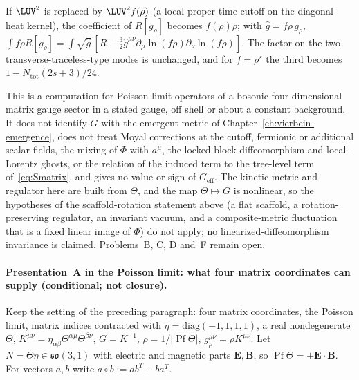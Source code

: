 If \(\LUV^2\) is replaced by \(\LUV^2f(\rho)\) (a local proper-time
cutoff on the diagonal heat kernel), the coefficient of
\(R[g_\rho]\) becomes \(f(\rho)\rho\); with
\(\hat g=f\rho\,g_\rho\),
\(\int f\rho R[g_\rho]=\int\sqrt{\hat g}\,[\hat R
-\tfrac32\hat g^{\mu\nu}\partial_\mu\ln(f\rho)\partial_\nu\ln(f\rho)]\).
The factor on the two transverse-traceless-type modes is unchanged, and
for \(f=\rho^s\) the third becomes \(1-N_{\mathrm{tot}}(2s+3)/24\).

This is a computation for Poisson-limit operators of a bosonic
four-dimensional matrix gauge sector in a stated gauge, off shell or
about a constant background. It does not identify \(G\) with the
emergent metric of Chapter~\ref{ch:vierbein-emergence}, does not
treat Moyal corrections at the cutoff, fermionic or additional scalar
fields, the mixing of \(\Phi\) with \(a^\mu\), the locked-block
diffeomorphism and local-Lorentz ghosts, or the relation of the induced
term to the tree-level term of~\eqref{eq:Smatrix}, and gives no value or
sign of \(G_{\mathrm{eff}}\). The kinetic metric and regulator here
are built from \(\Theta\), and the map \(\Theta\mapsto G\) is nonlinear,
so the hypotheses of the scaffold-rotation statement above (a flat
scaffold, a rotation-preserving regulator, an invariant vacuum, and a
composite-metric fluctuation that is a fixed linear image of \(\Phi\))
do not apply; no linearized-diffeomorphism invariance is claimed.
Problems~B, C, D and~F remain open.

\paragraph{Presentation~A in the Poisson limit: what four matrix coordinates can supply (conditional; not closure).}
Keep the setting of the preceding paragraph: four matrix coordinates, the Poisson limit, matrix indices contracted with \(\eta=\mathrm{diag}(-1,1,1,1)\), a real nondegenerate \(\Theta\), \(K^{\mu\nu}=\eta_{\alpha\beta}\Theta^{\alpha\mu}\Theta^{\beta\nu}\), \(G=K^{-1}\), \(\rho=1/|\operatorname{Pf}\Theta|\), \(g_\rho^{\mu\nu}=\rho K^{\mu\nu}\). Let \(N=\Theta\eta\in\mathfrak{so}(3,1)\) with electric and magnetic parts \(\mathbf E,\mathbf B\), so \(\operatorname{Pf}\Theta=\pm\mathbf E\cdot\mathbf B\). For vectors \(a,b\) write \(a\circ b:=ab^T+ba^T\).

